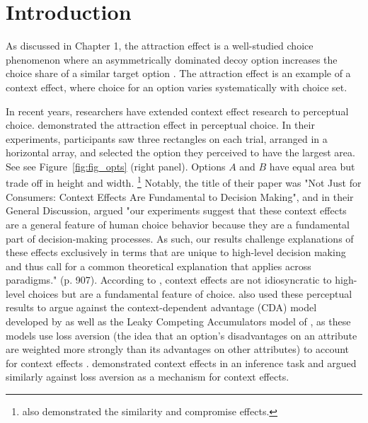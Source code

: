 \section{Introduction}

As discussed in Chapter 1, the attraction effect is a well-studied choice phenomenon where an asymmetrically dominated decoy option increases the choice share of a similar target option \parencite{huberAddingAsymmetricallyDominated1982d}. The attraction effect is an example of a context effect, where choice for an option varies systematically with choice set.

In recent years, researchers have extended context effect research to perceptual choice. \textcite{trueblood2013not} demonstrated the attraction effect in perceptual choice. In their experiments, participants saw three rectangles on each trial, arranged in a horizontal array, and selected the option they perceived to have the largest area. See see Figure~\ref{fig:fig_opts} (right panel).  Options $A$ and $B$ have equal area but trade off in height and width. \footnote{\textcite{trueblood2013not} also demonstrated the similarity and compromise effects.} Notably, the title of their paper was "Not Just for Consumers: Context Effects Are Fundamental to Decision Making", and in their General Discussion, \textcite{trueblood2013not} argued "our experiments suggest that these context effects are a general feature of human choice behavior because they are a fundamental part of decision-making processes. As such, our results challenge explanations of these effects exclusively in terms that are unique to high-level decision making and thus call for a common theoretical explanation that applies across paradigms." (p. 907). According to \textcite{trueblood2013not}, context effects are not idiosyncratic to high-level choices but are a fundamental feature of choice. \textcite{trueblood2013not} also used these perceptual results to argue against the context-dependent advantage (CDA) model developed by \textcite{tversky1993context} as well as the Leaky Competing Accumulators model of \textcite{usherLossAversionInhibition2004a}, as these models use loss aversion (the idea that an option's disadvantages on an attribute are weighted more strongly than its advantages on other attributes) to account for context effects \parencite[~see also]{truebloodPhantomDecoyEffect2017c}. \textcite{truebloodMultialternativeContextEffects2012} demonstrated context effects in an inference task and argued similarly against loss aversion as a mechanism for context effects. 

